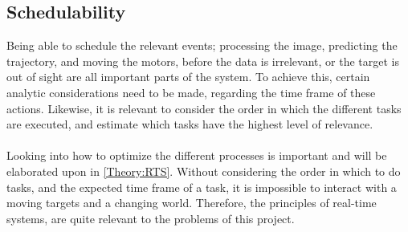 \subsection{Schedulability}
Being able to schedule the relevant events; processing the image, predicting the trajectory, and moving the motors, before the data is irrelevant, or the target is out of sight are all important parts of the system.
To achieve this, certain analytic considerations need to be made, regarding the time frame of these actions. 
Likewise, it is relevant to consider the order in which the different tasks are executed, and estimate which tasks have the highest level of relevance.
\\\\
Looking into how to optimize the different processes is important and will be elaborated upon in \autoref{Theory:RTS}.
Without considering the order in which to do tasks, and the expected time frame of a task, it is impossible to interact with a moving targets and a changing world. 
Therefore, the principles of real-time systems, are quite relevant to the problems of this project.

